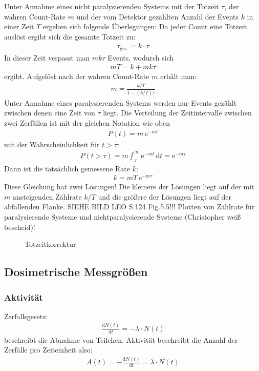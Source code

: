 \documentclass[11pt, a4paper]{article}
\numberwithin{equation}{section}
\begin{document}
Unter Annahme eines nicht paralysierenden Systems mit der Totzeit $\tau$, der wahren Count-Rate $m$ und der vom Detektor gezählten Anzahl der Events $k$ in einer Zeit $T$ ergeben sich folgende Überlegungen\cite{leo}:
Da jeder Count eine Totzeit auslöst ergibt sich die gesamte Totzeit zu:
\begin{align}
	\tau_\mathrm{ges.} = k \cdot \tau
\end{align}
In dieser Zeit verpasst man $m k \tau$ Events, wodurch sich
\begin{align}
	m T = k + m k \tau
\end{align}
ergibt. Aufgelöst nach der wahren Count-Rate $m$ erhält man:
\begin{align}
	m = \frac{k / T}{1 - (k/T) \tau}
\end{align}
Unter Annahme eines paralysierenden Systems werden nur Events gezählt zwischen denen eine Zeit von $\tau$ liegt.
Die Verteilung der Zeitintervalle zwischen zwei Zerfällen ist mit der gleichen Notation wie oben
\begin{align}
	P(t) = m \, \mathrm{e}^{-m t}
\end{align}
mit der Wahrscheinlichkeit für $t > \tau$:
\begin{align}
	P(t>\tau) = m \int_{\tau}^{\infty} \mathrm{e}^{-m t} \, \mathrm{d}t = \mathrm{e}^{-m \tau}
\end{align}
Dann ist die tatsächlich gemessene Rate $k$:
\begin{align}
	k = m T \, \mathrm{e}^{-m \tau} \label{eq:totzeit_paralysierend}
\end{align}
Diese Gleichung hat zwei Lösungen!
Die kleinere der Lösungen liegt auf der mit $m$ ansteigenden Zählrate $k/T$ und die größere der Lösungen liegt auf der abfallenden Flanke.
SIEHE BILD LEO S.124 Fig.5.5!!!
Plotten von Zählrate für paralysierende Systeme und nichtparalysierende Systeme (Christopher weiß bescheid)!
\begin{figure}[ht]
	\centering
	
	\caption{Totzeitkorrektur}
	\label{fig:totzeitkorrektur}
\end{figure}


\subsection{Dosimetrische Messgrößen}

\subsubsection{Aktivität}
Zerfallsgesetz:
\begin{align}
	\frac{\mathrm{d} N(t)}{\mathrm{d} t} = - \lambda \cdot N(t)
\end{align}
beschreibt die Abnahme von Teilchen.
Aktivität beschreibt die Anzahl der Zerfälle pro Zeiteinheit also:
\begin{align}
	A(t) = - \frac{\mathrm{d} N(t)}{\mathrm{d} t} = \lambda \cdot N(t)
\end{align}
\end{document}
